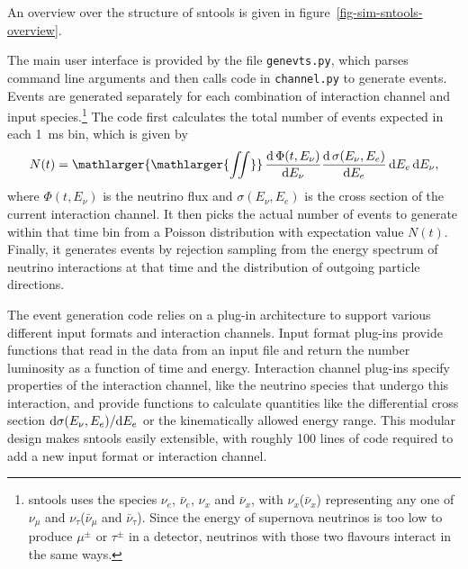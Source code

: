 \documentclass[11pt, oneside]{article}
\renewcommand{\d}{\mathrm{d}}
\newcommand{\tdiff}[3][\empty]{\ifx\empty#1
		\frac{\d\,#2}{\d #3}
	\else
		\frac{\d^{#1}\,#2}{\d #3^{#1}}
	\fi} %
\newcommand{\tdiffx}[3][\empty]{\ifx\empty#1
		\d #2 / \d #3
	\else
		\d^{#1} #2 / \d #3^{#1}
	\fi} %
\newcommand{\nue}{\ensuremath{\nu_e}\xspace}
\newcommand{\numu}{\ensuremath{\nu_\mu}\xspace}
\newcommand{\nutau}{\ensuremath{\nu_\tau}\xspace}
\newcommand{\nux}{\ensuremath{\nu_x}\xspace}
\newcommand{\nuebar}{\ensuremath{\bar{\nu}_e}\xspace}
\newcommand{\numubar}{\ensuremath{\bar{\nu}_\mu}\xspace}
\newcommand{\nutaubar}{\ensuremath{\bar{\nu}_\tau}\xspace}
\newcommand{\nuxbar}{\ensuremath{\bar{\nu}_x}\xspace}
\begin{document}
An overview over the structure of sntools is given in figure~\ref{fig-sim-sntools-overview}.

The main user interface is provided by the file \texttt{genevts.py}, which parses command line arguments and then calls code in \texttt{channel.py} to generate events.
Events are generated separately for each combination of interaction channel and input species.\footnote{sntools uses the species \nue, \nuebar, \nux and \nuxbar, with \nux (\nuxbar) representing any one of \numu and \nutau (\numubar and \nutaubar). Since the energy of supernova neutrinos is too low to produce $\mu^\pm$ or $\tau^\pm$ in a detector, neutrinos with those two flavours interact in the same ways.}
The code first calculates the total number of events expected in each \SI{1}{ms} bin, which is given by
\begin{equation}
N(t) = \mathop{\mathlarger{\mathlarger{\iint}}} \tdiff{\Phi (t, E_\nu)}{E_\nu} \tdiff{\sigma (E_\nu, E_e)}{E_e}\, \d E_e\,\d E_\nu,
\end{equation}
where $\Phi (t, E_\nu)$ is the neutrino flux and $\sigma (E_\nu, E_e)$ is the cross section of the current interaction channel.
It then picks the actual number of events to generate within that time bin from a Poisson distribution with expectation value $N(t)$.
Finally, it generates events by rejection sampling from the energy spectrum of neutrino interactions at that time and the distribution of outgoing particle directions.

The event generation code relies on a plug-in architecture to support various different input formats and interaction channels.
Input format plug-ins provide functions that read in the data from an input file and return the number luminosity as a function of time and energy.
Interaction channel plug-ins specify properties of the interaction channel, like the neutrino species that undergo this interaction, and provide functions to calculate quantities like the differential cross section $\tdiffx{\sigma (E_\nu, E_e)}{E_e}$ or the kinematically allowed energy range.
This modular design makes sntools easily extensible, with roughly 100 lines of code required to add a new input format or interaction channel.
\end{document}
